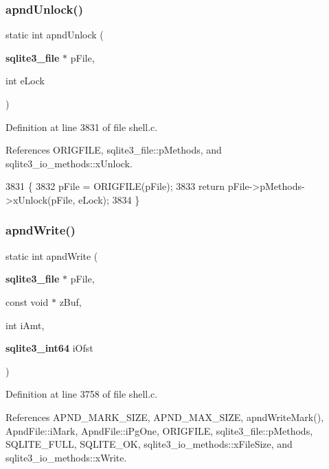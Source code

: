 \subsubsection{apnd\+Unlock()}
{\footnotesize\ttfamily static int apnd\+Unlock (\begin{DoxyParamCaption}\item[{\textbf{ sqlite3\+\_\+file} $\ast$}]{p\+File,  }\item[{int}]{e\+Lock }\end{DoxyParamCaption})\hspace{0.3cm}{\ttfamily [static]}}



Definition at line 3831 of file shell.\+c.



References O\+R\+I\+G\+F\+I\+LE, sqlite3\+\_\+file\+::p\+Methods, and sqlite3\+\_\+io\+\_\+methods\+::x\+Unlock.


\begin{DoxyCode}
3831                                                      \{
3832   pFile = ORIGFILE(pFile);
3833   \textcolor{keywordflow}{return} pFile->pMethods->xUnlock(pFile, eLock);
3834 \}
\end{DoxyCode}
\mbox{\label{shell_8c_a8cf8ea995613de257fae55a25639d9b8}} 
\subsubsection{apnd\+Write()}
{\footnotesize\ttfamily static int apnd\+Write (\begin{DoxyParamCaption}\item[{\textbf{ sqlite3\+\_\+file} $\ast$}]{p\+File,  }\item[{const void $\ast$}]{z\+Buf,  }\item[{int}]{i\+Amt,  }\item[{\textbf{ sqlite3\+\_\+int64}}]{i\+Ofst }\end{DoxyParamCaption})\hspace{0.3cm}{\ttfamily [static]}}



Definition at line 3758 of file shell.\+c.



References A\+P\+N\+D\+\_\+\+M\+A\+R\+K\+\_\+\+S\+I\+ZE, A\+P\+N\+D\+\_\+\+M\+A\+X\+\_\+\+S\+I\+ZE, apnd\+Write\+Mark(), Apnd\+File\+::i\+Mark, Apnd\+File\+::i\+Pg\+One, O\+R\+I\+G\+F\+I\+LE, sqlite3\+\_\+file\+::p\+Methods, S\+Q\+L\+I\+T\+E\+\_\+\+F\+U\+LL, S\+Q\+L\+I\+T\+E\+\_\+\+OK, sqlite3\+\_\+io\+\_\+methods\+::x\+File\+Size, and sqlite3\+\_\+io\+\_\+methods\+::x\+Write.



